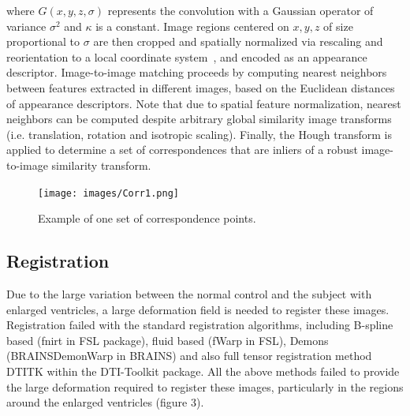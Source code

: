 \documentclass[]{spie}  %
\begin{document}
where $G(x,y,z,\sigma)$ represents the convolution with a Gaussian operator of variance $\sigma^2$ and $\kappa$ is a constant. Image regions centered on $x,y,z$ of size proportional to $\sigma$ are then cropped and spatially normalized via rescaling and reorientation to a local coordinate system~\cite{Allaire:08}, and encoded as an appearance descriptor. Image-to-image matching proceeds by computing nearest neighbors between features extracted in different images, based on the Euclidean distances of appearance descriptors. Note that due to spatial feature normalization, nearest neighbors can be computed despite arbitrary global similarity image transforms (i.e. translation, rotation and isotropic scaling). Finally, the Hough transform is applied to determine a set of correspondences that are inliers of a robust image-to-image similarity transform.

\begin{figure}[htb]
\label{fig:Correspondence}
\texttt{[image: images/Corr1.png]}
\centering
\caption{Example of one set of correspondence points.}
\end{figure}

\subsection{Registration}
Due to the large variation between the normal control and the subject with enlarged ventricles, a large deformation field is needed to register these images. Registration failed with the standard registration algorithms, including B-spline based (fnirt in FSL package), fluid based (fWarp in FSL), Demons (BRAINSDemonWarp in BRAINS) and also full tensor registration method DTITK within the DTI-Toolkit package. All the above methods failed to provide the large deformation required to register these images, particularly in the regions around the enlarged ventricles (figure 3).
\end{document}
